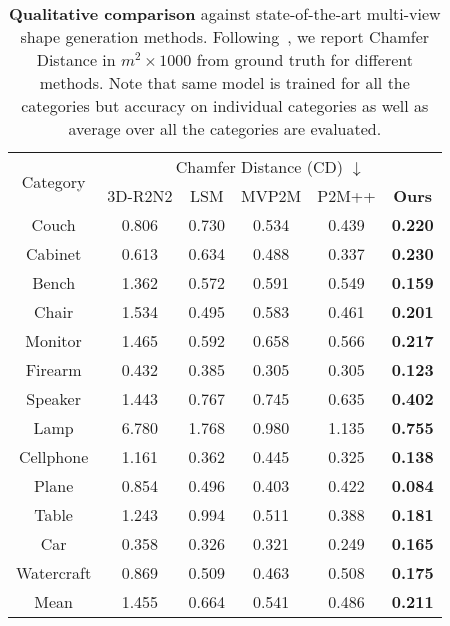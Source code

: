 \begin{table}[ht]
\begin{center}
\begin{tabular}{|c|ccccc|}
    \hline
    \multirow{2}{*}{Category}&
    \multicolumn{5}{c|}{Chamfer Distance (CD) $\downarrow$} \\
    & 3D-R2N2 & LSM & MVP2M & P2M++ & \bf{Ours} \\
    \hline
    Couch       & 0.806 & 0.730 & 0.534 & 0.439 & \bf{0.220} \\
    Cabinet     & 0.613 & 0.634 & 0.488 & 0.337 & \bf{0.230} \\
    Bench       & 1.362 & 0.572 & 0.591 & 0.549 & \bf{0.159} \\
    Chair       & 1.534 & 0.495 & 0.583 & 0.461 & \bf{0.201} \\
    Monitor     & 1.465 & 0.592 & 0.658 & 0.566 & \bf{0.217} \\
    Firearm     & 0.432 & 0.385 & 0.305 & 0.305 & \bf{0.123} \\
    Speaker     & 1.443 & 0.767 & 0.745 & 0.635 & \bf{0.402} \\
    Lamp        & 6.780 & 1.768 & 0.980 & 1.135 & \bf{0.755} \\
    Cellphone   & 1.161 & 0.362 & 0.445 & 0.325 & \bf{0.138} \\
    Plane       & 0.854 & 0.496 & 0.403 & 0.422 & \bf{0.084} \\
    Table       & 1.243 & 0.994 & 0.511 & 0.388 & \bf{0.181} \\
    Car         & 0.358 & 0.326 & 0.321 & 0.249 & \bf{0.165} \\
    Watercraft  & 0.869 & 0.509 & 0.463 & 0.508 & \bf{0.175} \\
    \hline
    Mean        & 1.455 & 0.664 & 0.541 & 0.486 & \bf{0.211} \\
    \hline
\end{tabular}
\end{center}
\caption{
    \textbf{Qualitative comparison} against state-of-the-art multi-view shape generation methods. Following~\cite{wen2019pixel2mesh++}, we report Chamfer Distance in $m^2 \times 1000$ from ground truth for different methods. Note that same model is trained for all the categories but accuracy on individual categories as well as average over all the categories are evaluated.
}
\label{table:baseline_comparison_cd}
\end{table}

